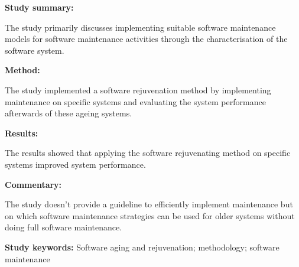 \begin{tcolorbox}[colback=gray!5!white, colframe=pastelgreen!40!black, title=A Software Maintenance Methodology: An Approach Applied to Software Aging\cite{Araujo2021}]
	\begin{minipage}[t]{0.25\textwidth}
		\textbf{Study summary:}
	\end{minipage}
	\hfill
	\begin{minipage}[t]{0.65\textwidth}
		The study primarily discusses implementing suitable software maintenance models for software
		maintenance activities through the characterisation of the software system.
	\end{minipage}

	\vspace{0.75em} 

	\begin{minipage}[t]{0.25\textwidth}
		\textbf{Method:}
	\end{minipage}
	\hfill
	\begin{minipage}[t]{0.65\textwidth}
		The study implemented a software rejuvenation method by implementing maintenance on specific systems and evaluating the system performance afterwards of these ageing systems.
	\end{minipage}

	\vspace{0.75em} 

	\begin{minipage}[t]{0.25\textwidth}
		\textbf{Results:}
	\end{minipage}
	\hfill
	\begin{minipage}[t]{0.65\textwidth}
		The results showed that applying the software rejuvenating method on specific systems improved system performance.
	\end{minipage}

	\vspace{0.75em} 

	\begin{minipage}[t]{0.25\textwidth}
		\textbf{Commentary:}
	\end{minipage}
	\hfill
	\begin{minipage}[t]{0.65\textwidth}
		The study doesn't provide a guideline to efficiently implement maintenance but on which
		software maintenance strategies can be used for older systems without doing full software maintenance.
	\end{minipage}
	\tcblower
	\textbf{Study keywords:} Software aging and rejuvenation; methodology; software maintenance
\end{tcolorbox}

